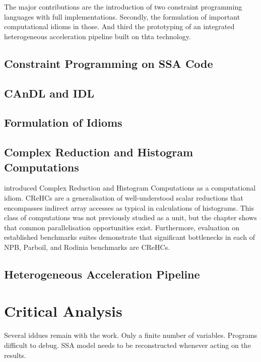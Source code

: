     The major contributions are the introduction of two constraint programming
    languages with full implementations.
    Secondly, the formulation of important computational idioms in those.
    And third the prototyping of an integrated heterogeneous acceleration
    pipeline built on thta technology.

    \subsection{Constraint Programming on SSA Code}

    \subsection{CAnDL and IDL}

    \subsection{Formulation of Idioms}

\subsection{Complex Reduction and Histogram Computations}

     introduced Complex Reduction and Histogram
    Computations as a computational idiom.
    CReHCs are a generalisation of well-understood scalar reductions that
    encompasses indirect array accesses as typical in calculations of
    histograms.
    This class of computations was not previously studied as a unit, but the
    chapter shows that common parallelisation opportunities exist.
    Furthermore, evaluation on established benchmarks suites demonstrate that
    significant bottlenecks in each of NPB, Parboil, and Rodinia benchmarks
    are CReHCs.

    \subsection{Heterogeneous Acceleration Pipeline}
    
\pagebreak
\section{Critical Analysis}

    Several iddues remain with the work.
    Only a finite number of variables.
    Programs difficult to debug.
    SSA model needs to be reconstructed whenever acting on the results.

